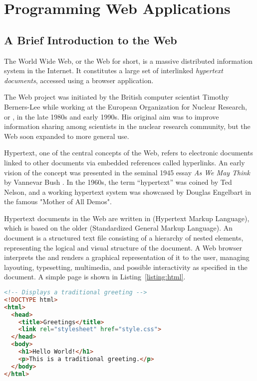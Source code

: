 \chapter{Programming Web Applications}

\section{A Brief Introduction to the Web}

The World Wide Web, or the Web for short, is a massive distributed information system in the Internet. It constitutes a large set of interlinked \emph{hypertext documents}, accessed using a browser application.

The Web project was initiated by the British computer scientist Timothy Berners-Lee while working at the European Organization for Nuclear Research, or , in the late \num{1980s} and early \num{1990s}. His original aim was to improve information sharing among scientists in the nuclear research community, but the Web soon expanded to more general use. \cite{TblProposal} \cite{TblWWW}

Hypertext, one of the central concepts of the Web, refers to electronic documents linked to other documents via embedded references called hyperlinks. An early vision of the concept was presented in the seminal \num{1945} essay \emph{As We May Think} by Vannevar Bush \cite{Bush45}. In the \num{1960s}, the term ``hypertext'' was coined by Ted Nelson, and a working hypertext system was showcased by Douglas Engelbart in the famous "Mother of All Demos".

Hypertext documents in the Web are written in  (Hypertext Markup Language), which is based on the older  (Standardized General Markup Language). An  document is a structured text file consisting of a hierarchy of nested elements, representing the logical and visual structure of the document. A Web browser interprets the  and renders a graphical representation of it to the user, managing layouting, typesetting, multimedia, and possible interactivity as specified in the document. A simple  page is shown in Listing~\ref{listing:html}. \cite{HTML20}

\begin{code}
\begin{lstlisting}[language=HTML,caption=A small \ab{html} document.\label{listing:html}]
<!-- Displays a traditional greeting -->
<!DOCTYPE html>
<html>
  <head>
    <title>Greetings</title>
    <link rel="stylesheet" href="style.css">
  </head>
  <body>
    <h1>Hello World!</h1>
    <p>This is a traditional greeting.</p>
  </body>
</html>
\end{lstlisting}
\end{code}

